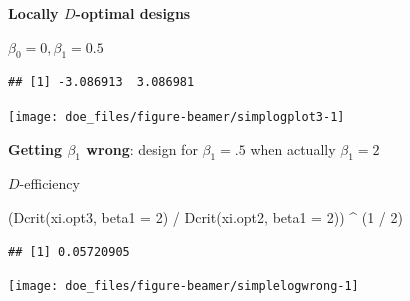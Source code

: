 \documentclass[
  ignorenonframetext,
]{beamer}
\newenvironment{Shaded}{\begin{snugshade}}{\end{snugshade}}
\newcommand{\AttributeTok}[1]{\textcolor[rgb]{0.77,0.63,0.00}{#1}}
\newcommand{\DecValTok}[1]{\textcolor[rgb]{0.00,0.00,0.81}{#1}}
\newcommand{\FunctionTok}[1]{\textcolor[rgb]{0.00,0.00,0.00}{#1}}
\newcommand{\NormalTok}[1]{#1}
\newcommand{\OtherTok}[1]{\textcolor[rgb]{0.56,0.35,0.01}{#1}}
\newcommand{\SpecialCharTok}[1]{\textcolor[rgb]{0.00,0.00,0.00}{#1}}
\begin{document}
\begin{frame}[fragile]{}
\protect\hypertarget{section-26}{}
\textbf{Locally \(D\)-optimal designs}

\(\beta_0 = 0, \beta_1 = 0.5\)

\begin{Shaded}
\end{Shaded}

\begin{verbatim}
## [1] -3.086913  3.086981
\end{verbatim}

\begin{center}\texttt{[image: doe\_files/figure-beamer/simplogplot3-1]} \end{center}
\end{frame}

\begin{frame}[fragile]{}
\protect\hypertarget{section-27}{}
\textbf{Getting \(\beta_1\) wrong}: design for \(\beta_1 = .5\) when
actually \(\beta_1 = 2\)

\(D\)-efficiency

\begin{Shaded}
\begin{Highlighting}[]
\NormalTok{(}\FunctionTok{Dcrit}\NormalTok{(xi.opt3, }\AttributeTok{beta1 =} \DecValTok{2}\NormalTok{) }\SpecialCharTok{/} \FunctionTok{Dcrit}\NormalTok{(xi.opt2, }\AttributeTok{beta1 =} \DecValTok{2}\NormalTok{)) }\SpecialCharTok{\^{}}\NormalTok{ (}\DecValTok{1} \SpecialCharTok{/} \DecValTok{2}\NormalTok{)}
\end{Highlighting}
\end{Shaded}

\begin{verbatim}
## [1] 0.05720905
\end{verbatim}

\begin{center}\texttt{[image: doe\_files/figure-beamer/simplelogwrong-1]} \end{center}
\end{frame}
\end{document}
